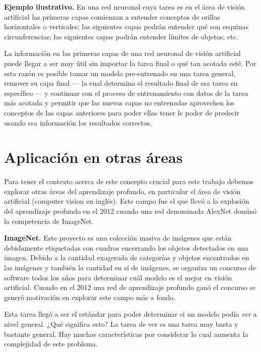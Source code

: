 \textbf{Ejemplo ilustrativo.} En una red neuronal cuya tarea es en el área de visión artificial las primeras capas comienzan a entender conceptos de orillas horizontales o verticales; las siguientes capas podrán entender qué son esquinas circunferencias; las siguientes capas podrán entender límites de objetos; etc.

La información en las primeras capas de una red neuronal de visión artificial puede llegar a ser muy útil sin importar la tarea final o qué tan acotada esté. Por esta razón es posible tomar un modelo pre-entrenado en una tarea general, remover su capa final --- la cual determina el resultado final de esa tarea en específico --- y continuar con el proceso de entrenamiento con datos de la tarea más acotada y permitir que las nuevas capas no entrenadas aprovechen los conceptos de las capas anteriores para poder ellas tener le poder de predecir usando esa información los resultados correctos.



\section{Aplicación en otras áreas}
Para tener el contexto acerca de este concepto crucial para este trabajo debemos explorar otras áreas del aprendizaje profundo, en particular el área de visión artificial (computer vision en inglés). Este campo fue el que llevó a la explosión del aprendizaje profundo en el 2012 cuando una red denominada AlexNet dominó la competencia de ImageNet.

\textbf{ImageNet.} Este proyecto es una colección masiva de imágenes que están debidamente etiquetadas con cuadros encerrando los objetos detectados en una imagen. Debido a la cantidad exagerada de categorías y objetos encontrados en las imágenes y también la cantidad en sí de imágenes, se organiza un concurso de software todos los años para determinar cuál modelo es el mejor en visión artificial. Cuando en el 2012 una red de aprendizaje profundo ganó el concurso se generó motivación en explorar este campo más a fondo.

Esta tarea llegó a ser el estándar para poder determinar si un modelo podía \emph{ver} a nivel general. ¿Qué significa esto? La tarea de ver es una tarea muy basta y bastante general. Hay muchas características por considerar lo cual aumenta la complejidad de este problema.


